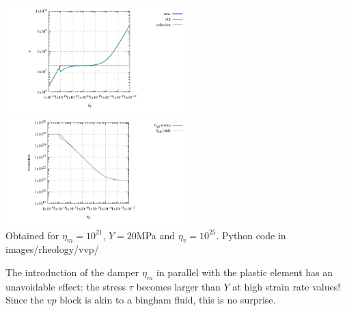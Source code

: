 \begin{itemize}
\begin{center}
\includegraphics[width=7cm]{images/rheology/vvp/tau_comp.pdf}
\includegraphics[width=7cm]{images/rheology/vvp/viscosities_comp.pdf}\\
{\captionfont Obtained for $\eta_m=10^{21}$, $Y=20$MPa and $\eta_v=10^{25}$. Python code 
in images/rheology/vvp/}
\end{center}

\begin{remark}
The introduction of the damper $\eta_m$ in parallel with the plastic element has an unavoidable
effect: the stress $\tau$ becomes larger than $Y$ at high strain rate values! Since the $vp$ 
block is akin to a bingham fluid, this is no surprise.
\end{remark}



%




\end{itemize}

